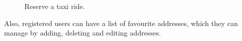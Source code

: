\begin{figure}%
	\hfill%
	\hfill%
	\caption{Reserve a taxi ride.}\label{fig:reservation}
\end{figure}

\newpage

Also, registered users can have a list of favourite addresses, which they can manage by adding, deleting and editing addresses.

